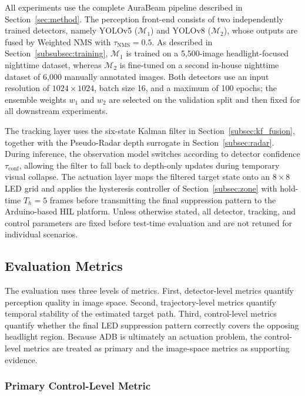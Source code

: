 \documentclass[pdflatex,sn-mathphys-num]{sn-jnl}%
\theoremstyle{thmstyleone}%
\theoremstyle{thmstyletwo}%
\theoremstyle{thmstylethree}%
\begin{document}
All experiments use the complete AuraBeam pipeline described in
Section~\ref{sec:method}. The perception front-end consists of two
independently trained detectors, namely YOLOv5 ($\mathcal{M}_1$) and
YOLOv8 ($\mathcal{M}_2$), whose outputs are fused by Weighted NMS with
$\tau_{\mathrm{NMS}} = 0.5$. As described in
Section~\ref{subsubsec:training}, $\mathcal{M}_1$ is trained on a
5{,}500-image headlight-focused nighttime dataset, whereas
$\mathcal{M}_2$ is fine-tuned on a second in-house nighttime dataset of
6{,}000 manually annotated images. Both detectors use an input
resolution of $1024\times1024$, batch size 16, and a maximum of 100
epochs; the ensemble weights $w_1$ and $w_2$ are selected on the
validation split and then fixed for all downstream experiments.

The tracking layer uses the six-state Kalman filter in
Section~\ref{subsec:kf_fusion}, together with the Pseudo-Radar depth
surrogate in Section~\ref{subsec:radar}. During inference, the
observation model switches according to detector confidence
$\tau_{\mathrm{conf}}$, allowing the filter to fall back to depth-only
updates during temporary visual collapse. The actuation layer maps the
filtered target state onto an $8\times8$ LED grid and applies the
hysteresis controller of Section~\ref{subsec:zone} with hold-time
$T_h = 5$ frames before transmitting the final suppression pattern to
the Arduino-based HIL platform. Unless otherwise stated, all detector,
tracking, and control parameters are fixed before test-time evaluation
and are not retuned for individual scenarios.

\subsection{Evaluation Metrics}
\label{subsec:eval_metrics}

The evaluation uses three levels of metrics. First, detector-level
metrics quantify perception quality in image space. Second,
trajectory-level metrics quantify temporal stability of the estimated
target path. Third, control-level metrics quantify whether the final LED
suppression pattern correctly covers the opposing headlight region.
Because ADB is ultimately an actuation problem, the control-level
metrics are treated as primary and the image-space metrics as
supporting evidence.

\subsubsection{Primary Control-Level Metric}
\end{document}
